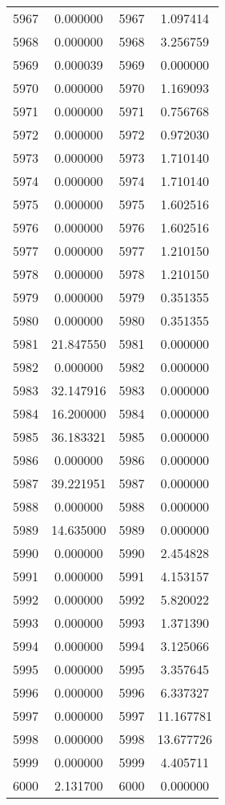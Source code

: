 \documentclass[12pt]{article}
\begin{document}
\begin{longtable}{@{}cccc@{}}
5967 & 0.000000 & 5967 & 1.097414 \\
5968 & 0.000000 & 5968 & 3.256759 \\
5969 & 0.000039 & 5969 & 0.000000 \\
5970 & 0.000000 & 5970 & 1.169093 \\
5971 & 0.000000 & 5971 & 0.756768 \\
5972 & 0.000000 & 5972 & 0.972030 \\
5973 & 0.000000 & 5973 & 1.710140 \\
5974 & 0.000000 & 5974 & 1.710140 \\
5975 & 0.000000 & 5975 & 1.602516 \\
5976 & 0.000000 & 5976 & 1.602516 \\
5977 & 0.000000 & 5977 & 1.210150 \\
5978 & 0.000000 & 5978 & 1.210150 \\
5979 & 0.000000 & 5979 & 0.351355 \\
5980 & 0.000000 & 5980 & 0.351355 \\
5981 & 21.847550 & 5981 & 0.000000 \\
5982 & 0.000000 & 5982 & 0.000000 \\
5983 & 32.147916 & 5983 & 0.000000 \\
5984 & 16.200000 & 5984 & 0.000000 \\
5985 & 36.183321 & 5985 & 0.000000 \\
5986 & 0.000000 & 5986 & 0.000000 \\
5987 & 39.221951 & 5987 & 0.000000 \\
5988 & 0.000000 & 5988 & 0.000000 \\
5989 & 14.635000 & 5989 & 0.000000 \\
5990 & 0.000000 & 5990 & 2.454828 \\
5991 & 0.000000 & 5991 & 4.153157 \\
5992 & 0.000000 & 5992 & 5.820022 \\
5993 & 0.000000 & 5993 & 1.371390 \\
5994 & 0.000000 & 5994 & 3.125066 \\
5995 & 0.000000 & 5995 & 3.357645 \\
5996 & 0.000000 & 5996 & 6.337327 \\
5997 & 0.000000 & 5997 & 11.167781 \\
5998 & 0.000000 & 5998 & 13.677726 \\
5999 & 0.000000 & 5999 & 4.405711 \\
6000 & 2.131700 & 6000 & 0.000000 \\

\end{longtable}
\end{document}
